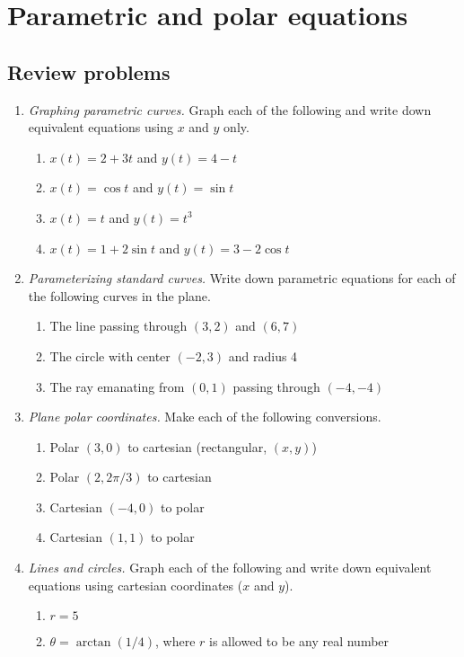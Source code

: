 \section{Parametric and polar equations}

\subsection{Review problems}

\begin{enumerate}
\item \emph{Graphing parametric curves.} Graph each of the following and write down equivalent equations using $x$ and $y$ only.
\begin{enumerate}
\item $x(t) = 2 + 3t$ and $y(t) = 4 - t$
\item $x(t) = \cos t$ and $y(t) = \sin t$
\item $x(t) = t$ and $y(t) = t^3$
\item $x(t) = 1 + 2\sin t$ and $y(t) = 3 - 2\cos t$
\end{enumerate}
\item \emph{Parameterizing standard curves.} Write down parametric equations for each of the following curves in the plane.
\begin{enumerate}
\item The line passing through $(3,2)$ and $(6,7)$
\item The circle with center $(-2,3)$ and radius 4
\item The ray emanating from $(0,1)$ passing through $(-4,-4)$
\end{enumerate}
\item \emph{Plane polar coordinates.} Make each of the following conversions.
\begin{enumerate}
\item Polar $(3,0)$ to cartesian (rectangular, $(x,y)$)
\item Polar $(2,2\pi/3)$ to cartesian
\item Cartesian $(-4,0)$ to polar
\item Cartesian $(1,1)$ to polar
\end{enumerate}
\item \emph{Lines and circles.} Graph each of the following and write down equivalent equations using cartesian coordinates ($x$ and $y$).
\begin{enumerate}
\item $r = 5$
\item $\theta = \arctan(1/4)$, where $r$ is allowed to be any real number

\end{enumerate}
\end{enumerate}
